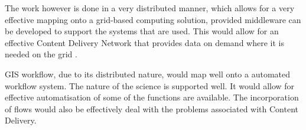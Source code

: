 \documentclass[11pt,twocolumn]{article}
\begin{document}
   The work however is done in a very distributed manner, which allows
   for a very effective mapping onto a grid-based computing solution,
   provided middleware can be developed to support the systems that
   are used. This would allow for an  effective Content Delivery Network
   that provides data on demand where it is needed on the grid
   \cite{Montella:2007:UGC:1272980.1272995}.

   GIS workflow, due to its distributed nature, would map
   well onto a automated workflow system. The nature of the science
   is supported well. It would allow for effective automatisation
   of some of the functions are available. The incorporation of flows
   would also be effectively deal with
   the
   problems associated with Content Delivery.
   \cite{Withana:2010:VWE:1851476.1851586}

{}

\end{document}
